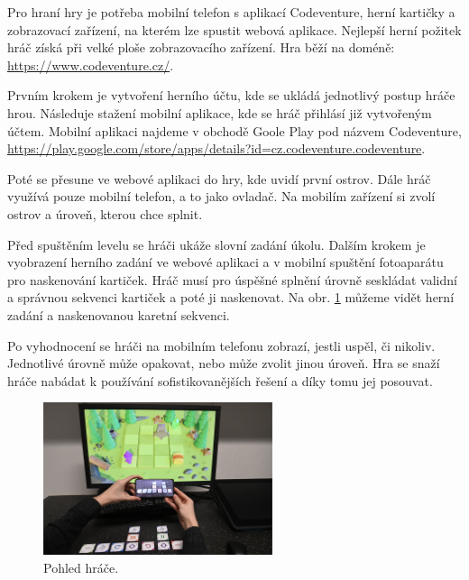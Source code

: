 Pro hraní hry je potřeba mobilní telefon s aplikací Codeventure, herní kartičky a zobrazovací zařízení, na kterém lze spustit webová aplikace. Nejlepší herní požitek hráč získá při velké ploše zobrazovacího zařízení. Hra běží na doméně: \url{https://www.codeventure.cz/}.\par
Prvním krokem je vytvoření herního účtu, kde se ukládá jednotlivý postup hráče hrou. Následuje stažení mobilní aplikace, kde se hráč přihlásí již vytvořeným účtem. Mobilní aplikaci najdeme v obchodě Goole Play pod názvem Codeventure, \url{https://play.google.com/store/apps/details?id=cz.codeventure.codeventure}.\par
Poté se přesune ve webové aplikaci do hry, kde uvidí první ostrov. Dále hráč využívá pouze mobilní telefon, a to jako ovladač. Na mobilím zařízení si zvolí ostrov a úroveň, kterou chce splnit.\par
Před spuštěním levelu se hráči ukáže slovní zadání úkolu. Dalším krokem je vyobrazení herního zadání ve webové aplikaci a v mobilní spuštění fotoaparátu pro naskenování kartiček. Hráč musí pro úspěšné splnění úrovně seskládat validní a správnou sekvenci kartiček a poté ji naskenovat. Na obr. \ref{fig:pohled-hrace} můžeme vidět herní zadání a naskenovanou karetní sekvenci.\par
Po vyhodnocení se hráči na mobilním telefonu zobrazí, jestli uspěl, či nikoliv. Jednotlivé úrovně může opakovat, nebo může zvolit jinou úroveň. Hra se snaží hráče nabádat k používání sofistikovanějších řešení a díky tomu jej posouvat. 

\begin{figure}[h]
    \centering
    \includegraphics[width=0.6\textwidth]{img/pohled-hrace.png}
    \caption{Pohled hráče.}
    \label{fig:pohled-hrace}
\end{figure}